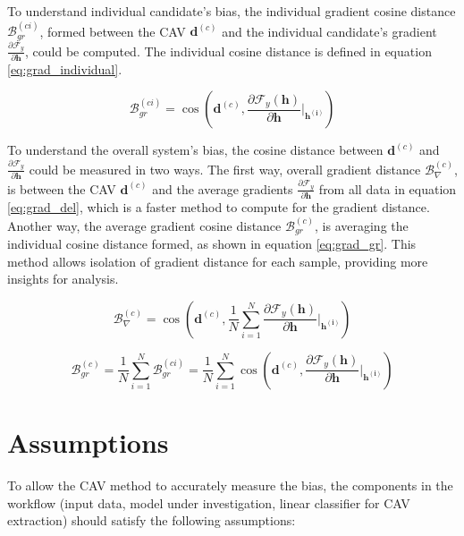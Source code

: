 To understand individual candidate's bias, the individual gradient cosine distance $\mathcal{B}^{(ci)}_{gr}$, formed between the CAV $\boldsymbol{d}^{(c)}$ and the individual candidate's gradient $\frac{\partial \mathcal{F}_y}{\partial \boldsymbol{h}}$, could be computed. The individual cosine distance is defined in equation \ref{eq:grad_individual}.  

\begin{equation} \label{eq:grad_individual}
    \mathcal{B}^{(ci)}_{gr} = \cos\left(\boldsymbol{d}^{(c)}, \frac{\partial \mathcal{F}_y(\boldsymbol{h})}{\partial \boldsymbol{h}}\vert_{\boldsymbol{h^{(i)}}} \right)
\end{equation}

To understand the overall system's bias, the cosine distance between $\boldsymbol{d}^{(c)}$ and $\frac{\partial \mathcal{F}_y}{\partial \boldsymbol{h}}$ could be measured in two ways. The first way, overall gradient distance $\mathcal{B}^{(c)}_{\nabla}$,  is between the CAV $\boldsymbol{d}^{(c)}$ and the average gradients $\frac{\partial \mathcal{F}_y}{\partial \boldsymbol{h}}$ from all data in equation \ref{eq:grad_del}, which is a faster method to compute for the gradient distance. Another way, the average gradient cosine distance $\mathcal{B}^{(c)}_{gr}$, is averaging the individual cosine distance formed, as shown in equation \ref{eq:grad_gr}. This method allows isolation of gradient distance for each sample, providing more insights for analysis.

\begin{equation} \label{eq:grad_del}
    \mathcal{B}^{(c)}_{\nabla} = \cos\left(\boldsymbol{d}^{(c)}, \frac{1}{N} \sum_{i=1}^{N} \frac{\partial \mathcal{F}_y(\boldsymbol{h})}{\partial \boldsymbol{h}}\vert_{\boldsymbol{h^{(i)}}} \right)
\end{equation}

\begin{equation} \label{eq:grad_gr}
    \mathcal{B}^{(c)}_{gr} = \frac{1}{N} \sum_{i=1}^{N} \mathcal{B}^{(ci)}_{gr} = \frac{1}{N} \sum_{i=1}^{N}\cos\left(\boldsymbol{d}^{(c)}, \frac{\partial \mathcal{F}_y(\boldsymbol{h})}{\partial \boldsymbol{h}}\vert_{\boldsymbol{h^{(i)}}} \right)
\end{equation}

\section{Assumptions}
To allow the CAV method to accurately measure the bias, the components in the workflow (input data, model under investigation, linear classifier for CAV extraction) should satisfy the following assumptions:

